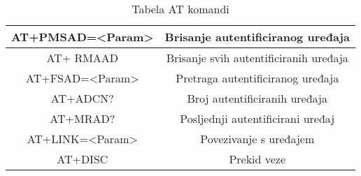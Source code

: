 \documentclass[../Document.tex]{subfiles}
\begin{document}
\begin{table}[h]
\begin{tabular}{ |c|c| }
        AT+PMSAD=<Param>                  & Brisanje autentificiranog uređaja         \\\hline
        AT+ RMAAD                         & Brisanje svih autentificiranih uređaja    \\\hline
        AT+FSAD=<Param>                   & Pretraga autentificiranog  uređaja        \\\hline
        AT+ADCN?                          & Broj autentificiranih uređaja             \\\hline
        AT+MRAD?                          & Posljednji autentificirani uređaj         \\\hline
        AT+LINK=<Param>                   & Povezivanje s uređajem                    \\\hline
        AT+DISC                           & Prekid veze                               \\\hline
    \end{tabular}
    \caption{Tabela AT komandi}
    \def\arraystretch{1}
\end{table}
\end{document}
